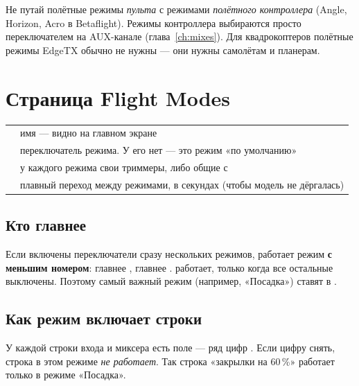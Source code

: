 \begin{note}
Не путай полётные режимы \emph{пульта} с режимами \emph{полётного контроллера} (Angle, Horizon,
Acro в Betaflight). Режимы контроллера выбираются просто переключателем на AUX-канале
(глава~\ref{ch:mixes}). Для квадрокоптеров полётные режимы EdgeTX обычно не нужны ---
они нужны самолётам и планерам.
\end{note}

\section{Страница Flight Modes}

\begin{center}
\end{center}

\begin{center}\small
\renewcommand{\arraystretch}{1.2}
\begin{tabularx}{\linewidth}{@{}L{30mm}Y@{}}
\toprule
{} & имя --- видно на главном экране \\
 & переключатель режима. У  его нет --- это режим «по умолчанию» \\
 & у каждого режима свои триммеры, либо общие с  \\
 & плавный переход между режимами, в секундах (чтобы модель не дёргалась) \\
\bottomrule
\end{tabularx}
\end{center}

\subsection{Кто главнее}

Если включены переключатели сразу нескольких режимов, работает режим \textbf{с меньшим номером}:
 главнее ,  главнее .  работает, только когда все
остальные выключены. Поэтому самый важный режим (например, «Посадка») ставят в .

\subsection{Как режим включает строки}

У каждой строки входа и миксера есть поле  --- ряд цифр
. Если цифру снять, строка в этом режиме \emph{не работает}. Так строка
«закрылки на 60\,\%» работает только в режиме «Посадка».

